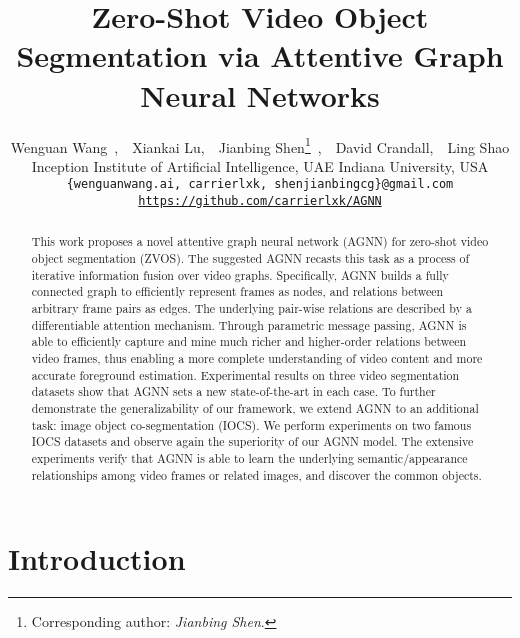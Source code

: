 \documentclass[10pt,twocolumn,letterpaper]{article}
\begin{document}
\title{Zero-Shot Video Object Segmentation via Attentive Graph Neural Networks}
\def\httilde{\mbox{\tt\raisebox{-.5ex}{\symbol{126}}}}
\author{ Wenguan Wang~,~~\hspace{1pt}Xiankai Lu,~~Jianbing Shen\thanks{Corresponding author: \textit{Jianbing Shen}.}~,~~David Crandall,~~Ling Shao\hspace{1pt}   \\
	\small{} \small Inception Institute of Artificial Intelligence, UAE \hspace{0pt}
	\small{} \small Indiana University, USA \hspace{0pt} \\
	{\tt\small \{wenguanwang.ai, carrierlxk, shenjianbingcg\}@gmail.com}\\
 {\tt\small \url{https://github.com/carrierlxk/AGNN}}
}

\maketitle
\thispagestyle{empty}


\begin{abstract}
   This work proposes a novel attentive graph neural network (AGNN) for zero-shot video object segmentation (ZVOS). The suggested AGNN recasts this task as a process of iterative information fusion over video graphs. Specifically, AGNN builds a fully connected graph to efficiently represent frames as nodes, and relations between arbitrary frame pairs as edges. The underlying pair-wise relations are described by a differentiable attention mechanism. Through parametric message passing, AGNN is able to efficiently capture and mine much richer and higher-order relations between video frames, thus enabling a more complete understanding of video content and more accurate foreground estimation. Experimental results on three video segmentation datasets show that AGNN sets a new state-of-the-art in each case. To further  demonstrate the generalizability of our framework, we extend AGNN to an additional task: image object co-segmentation (IOCS). We perform experiments on two famous IOCS datasets and observe again the superiority of our AGNN model. The extensive experiments verify that AGNN is able to learn the underlying semantic/appearance relationships among video frames or related images, and discover the common objects. \end{abstract}

\vspace{-6pt}
\section{Introduction}
	\vspace*{-4pt}	
\end{document}
